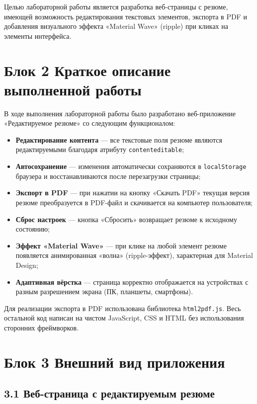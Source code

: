 \documentclass[a4paper,14pt,oneside,openany]{memoir}
\begin{document}
Целью лабораторной работы является разработка веб-страницы с резюме, имеющей возможность редактирования текстовых элементов, экспорта в PDF и добавления визуального эффекта «Material Wave» (ripple) при кликах на элементы интерфейса.

\section{Блок 2 Краткое описание выполненной работы}

В ходе выполнения лабораторной работы было разработано веб-приложение «Редактируемое резюме» со следующим функционалом:

\begin{itemize}
    \item \textbf{Редактирование контента} — все текстовые поля резюме являются редактируемыми благодаря атрибуту \texttt{contenteditable};
    \item \textbf{Автосохранение} — изменения автоматически сохраняются в \texttt{localStorage} браузера и восстанавливаются после перезагрузки страницы;
    \item \textbf{Экспорт в PDF} — при нажатии на кнопку «Скачать PDF» текущая версия резюме преобразуется в PDF-файл и скачивается на компьютер пользователя;
    \item \textbf{Сброс настроек} — кнопка «Сбросить» возвращает резюме к исходному состоянию;
    \item \textbf{Эффект «Material Wave»} — при клике на любой элемент резюме появляется анимированная «волна» (ripple-эффект), характерная для Material Design;
    \item \textbf{Адаптивная вёрстка} — страница корректно отображается на устройствах с разным разрешением экрана (ПК, планшеты, смартфоны).
\end{itemize}

Для реализации экспорта в PDF использована библиотека \texttt{html2pdf.js}. Весь остальной код написан на чистом JavaScript, CSS и HTML без использования сторонних фреймворков.

\section{Блок 3 Внешний вид приложения}

\subsection{3.1 Веб-страница с редактируемым резюме}
\end{document}
